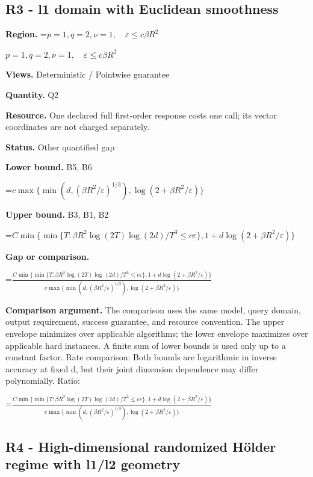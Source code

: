 \documentclass[10pt,a4paper]{article}
\newcommand{\AtlasMath}[1]{\par\begingroup\centering\setbox0=\hbox{$\displaystyle #1$}\ifdim\wd0>1.4\linewidth\typeout{ATLAS WIDE FORMULA: \the\wd0}\fi\ifdim\wd0>\linewidth\resizebox{\linewidth}{!}{\box0}\else\box0\fi\par\endgroup}
\newcommand{\AtlasInlineMath}[1]{\begingroup\setbox0=\hbox{$#1$}\ifdim\wd0>.4\linewidth\endgroup\AtlasMath{#1}\else\endgroup$#1$\fi}
\begin{document}
\subsection{R3 - l1 domain with Euclidean smoothness}


\textbf{Region.} \AtlasInlineMath{p=1,q=2,\nu=1,\quad\varepsilon\le c\beta R^2}



\textbf{Views.} Deterministic / Pointwise guarantee



\textbf{Quantity.} Q2



\textbf{Resource.} One declared full first-order response costs one call; its vector coordinates are not charged separately.



\textbf{Status.} Other quantified gap



\textbf{Lower bound.} B5, B6



\AtlasMath{c\max\{\min(d,(\beta R^2/\varepsilon)^{1/3}),\log(2+\beta R^2/\varepsilon)\}}


\textbf{Upper bound.} B3, B1, B2



\AtlasMath{C\min\{\min\{T:\beta R^2\log(2T)\log(2d)/T^3\le c\varepsilon\},1+d\log(2+\beta R^2/\varepsilon)\}}


\textbf{Gap or comparison.}
\AtlasMath{\frac{C\min\{\min\{T:\beta R^2\log(2T)\log(2d)/T^3\le c\varepsilon\},1+d\log(2+\beta R^2/\varepsilon)\}}{c\max\{\min(d,(\beta R^2/\varepsilon)^{1/3}),\log(2+\beta R^2/\varepsilon)\}}}




\textbf{Comparison argument.} The comparison uses the same model, query domain, output requirement, success guarantee, and resource convention. The upper envelope minimizes over applicable algorithms; the lower envelope maximizes over applicable hard instances. A finite sum of lower bounds is used only up to a constant factor. Rate comparison: Both bounds are logarithmic in inverse accuracy at fixed d, but their joint dimension dependence may differ polynomially. Ratio:
\AtlasMath{\frac{C\min\{\min\{T:\beta R^2\log(2T)\log(2d)/T^3\le c\varepsilon\},1+d\log(2+\beta R^2/\varepsilon)\}}{c\max\{\min(d,(\beta R^2/\varepsilon)^{1/3}),\log(2+\beta R^2/\varepsilon)\}}}




\subsection{R4 - High-dimensional randomized Hölder regime with l1/l2 geometry}
\end{document}
